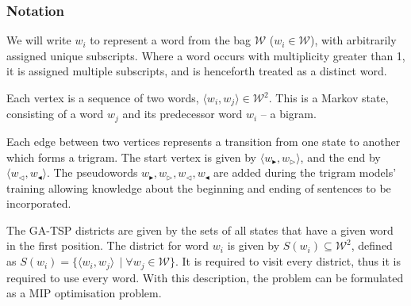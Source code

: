 \documentclass[twocolumn]{article}
\begin{document}
\renewcommand{\s}{w_{\blacktriangleright}}
\renewcommand{\ss}{w_{\triangleright}}
\newcommand{\e}{w_{\triangleleft}}
\newcommand{\ee}{w_{\blacktriangleleft}}
\newcommand{\W}{\mathcal{W}}

\newcommand{\displayunskip}{\vspace{0pt}}

\subsubsection{Notation}
We will write $w_{i}$ to represent a word from the bag \textbf{$\W$} ($w_i\in \W$), with
arbitrarily assigned unique subscripts. Where a word occurs with multiplicity
greater than 1, it is assigned multiple subscripts, and is henceforth treated as a distinct word.

Each vertex is a sequence of two words, $\langle w_{i},w_{j}\rangle\in\W^{2}$.
This is a Markov state, consisting of a word $w_j$ and its predecessor word $w_i$ -- a bigram.

Each edge between two vertices represents a transition from one state to another which forms a trigram.
The start vertex is given by $\langle\s,\ss\rangle$, and the end by $\langle\e,\ee\rangle$. The pseudowords  $\s,\ss,\e,\ee$ are added during the trigram models' training allowing knowledge about the beginning and ending of sentences to be incorporated.

The GA-TSP districts are given by the sets of all states that have
a given word in the first position. The district for word $w_{i}$
is given by $S(w_{i})\subseteq\W^{2}$, defined as $S(w_{i})=\{\langle w_{i},w_{j}\rangle\,\mid \forall w_{j}\in\W\}$. It is required to visit every district, thus it is required to use every word.
With this description, the problem can be formulated as a MIP optimisation problem.
\end{document}
